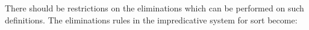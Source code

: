 There should be restrictions on the eliminations which can be
performed on such definitions. The eliminations rules in the
impredicative system for sort \Set{} become:
\begin{description}
\item[\Set] 
\end{description}
     




